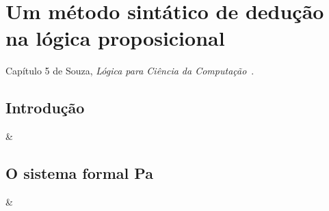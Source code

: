 \chapter{Um método sintático de dedução na lógica proposicional}


Capítulo 5 de Souza, \textit{Lógica para Ciência da Computação}~\cite{souza_logica_3}.

\vspace{1cm}


\section{Introdução}

\begin{easylist}
  & 
\end{easylist}


\section{O sistema formal Pa}

\begin{easylist}
  &
\end{easylist}


